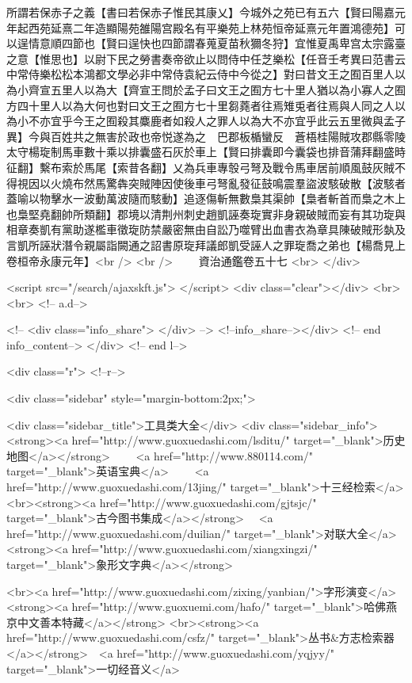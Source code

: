 所謂若保赤子之義【書曰若保赤子惟民其康乂】今城外之苑已有五六【賢曰陽嘉元年起西苑延熹二年造顯陽苑雒陽宫殿名有平樂苑上林苑恒帝延熹元年置鴻德苑】可以逞情意順四節也【賢曰逞快也四節謂春蒐夏苗秋獮冬狩】宜惟夏禹卑宫太宗露臺之意【惟思也】以尉下民之勞書奏帝欲止以問侍中任芝樂松【任音壬考異曰范書云中常侍樂松松本鴻都文學必非中常侍袁紀云侍中今從之】對曰昔文王之囿百里人以為小齊宣五里人以為大【齊宣王問於孟子曰文王之囿方七十里人猶以為小寡人之囿方四十里人以為大何也對曰文王之囿方七十里芻蕘者往焉雉兎者往焉與人同之人以為小不亦宜乎今王之囿殺其麋鹿者如殺人之罪人以為大不亦宜乎此云五里微與孟子異】今與百姓共之無害於政也帝悦遂為之　巴郡板楯蠻反　蒼梧桂陽賊攻郡縣零陵太守楊琁制馬車數十乘以排囊盛石灰於車上【賢曰排囊即今囊袋也排音蒲拜翻盛時征翻】繫布索於馬尾【索昔各翻】乂為兵車專彀弓弩及戰令馬車居前順風鼓灰賊不得視因以火燒布然馬驚犇突賊陣因使後車弓弩亂發征鼓鳴震羣盜波駭破散【波駭者蓋喻以物擊水一波動萬波隨而駭動】追逐傷斬無數梟其渠帥【梟者斬首而梟之木上也梟堅堯翻帥所類翻】郡境以清荆州刺史趙凱誣奏琁實非身親破賊而妄有其功琁與相章奏凱有黨助遂檻車徵琁防禁嚴密無由自訟乃噬臂出血書衣為章具陳破賊形埶及言凱所誣狀潛令親屬詣闕通之詔書原琁拜議郎凱受誣人之罪琁喬之弟也【楊喬見上卷桓帝永康元年】<br />
<br />
　　資治通鑑卷五十七  <br>
   </div> 

<script src="/search/ajaxskft.js"> </script>
 <div class="clear"></div>
<br>
<br>
 <!-- a.d-->

 <!--
<div class="info_share">
</div> 
-->
 <!--info_share--></div>   <!-- end info_content-->
  </div> <!-- end l-->

<div class="r">   <!--r-->



<div class="sidebar"  style="margin-bottom:2px;">

 
<div class="sidebar_title">工具类大全</div>
<div class="sidebar_info">
<strong><a href="http://www.guoxuedashi.com/lsditu/" target="_blank">历史地图</a></strong>　　
<a href="http://www.880114.com/" target="_blank">英语宝典</a>　　
<a href="http://www.guoxuedashi.com/13jing/" target="_blank">十三经检索</a>　
<br><strong><a href="http://www.guoxuedashi.com/gjtsjc/" target="_blank">古今图书集成</a></strong>　
<a href="http://www.guoxuedashi.com/duilian/" target="_blank">对联大全</a>　<strong><a href="http://www.guoxuedashi.com/xiangxingzi/" target="_blank">象形文字典</a></strong>　

<br><a href="http://www.guoxuedashi.com/zixing/yanbian/">字形演变</a>　　<strong><a href="http://www.guoxuemi.com/hafo/" target="_blank">哈佛燕京中文善本特藏</a></strong>
<br><strong><a href="http://www.guoxuedashi.com/csfz/" target="_blank">丛书&方志检索器</a></strong>　<a href="http://www.guoxuedashi.com/yqjyy/" target="_blank">一切经音义</a>　　

